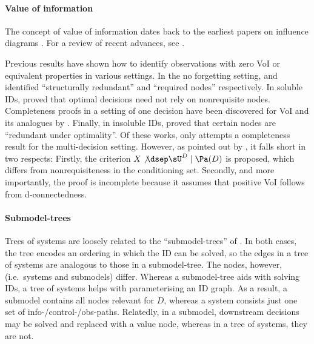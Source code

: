\newcommand{\aref}[1]{\hyperref[#1]{Appendix~\ref{#1}}} %

\paragraph{Value of information}
The concept of value of information dates back to the earliest
papers on influence diagrams \citep{Howard1966,matheson1968economic}.
For a review of recent advances, 
see \citet{borgonovo2016sensitivity}.~

Previous results have shown how to identify 
observations with zero VoI or equivalent properties
in various settings.
In the no forgetting setting, 
\citet{Fagiuoli1998} and \citet{Nielsen1999}
identified ``structurally redundant''
and ``required nodes'' respectively.
In soluble IDs,
\citet{nilsson2000evaluating} 
proved that optimal decisions need not 
rely on nonrequisite nodes.
Completeness proofs in a setting of one decision have been discovered for VoI and its analogues by
\citet{zhang2020causal,lee2020characterizing,Everitt2021agent}.
Finally, in insoluble IDs,
\citet{lee2020characterizing}
proved that certain nodes are
``redundant under optimality''.
Of these works, only \citet{Nielsen1999} attempts a completeness result for the multi-decision setting.
However, as pointed out by \citet{Everitt2021agent}, it falls short in two respects:
Firstly, the criterion $X \not \dsep \sU^D \mid \Pa(D)$ is proposed, which differs from 
nonrequisiteness
in the conditioning set.
Secondly, and more importantly, 
the proof is incomplete because it 
assumes that positive VoI follows from d-connectedness.%

\paragraph{Submodel-trees}
Trees of systems are loosely related to the ``submodel-trees'' of \citet{lee2021submodel}.
In both cases, the tree encodes an ordering in which the ID can be solved, so the edges in a tree of systems are analogous to those in a submodel-tree. 
The nodes, however, (i.e.\ systems and submodels) differ.
Whereas a submodel-tree aids with solving IDs, a tree of systems helps with parameterising an ID graph. 
As a result, a submodel contains all nodes relevant for $D$, whereas a system consists just one set of info-/control-/obs-paths. 
Relatedly, in a submodel, downstream decisions may be solved and replaced with a value node, whereas in a tree of systems, they are not.~














